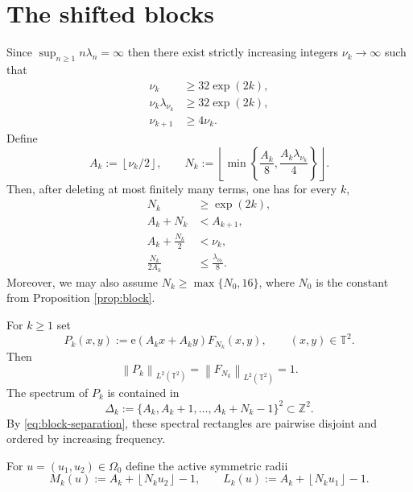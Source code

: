 \documentclass[11pt]{amsart}
\numberwithin{equation}{section}
\begin{document}
\section{The shifted blocks}

Since $\sup_{n\geq 1}n\lambda _{n}=\infty $ then there exist strictly
increasing integers $\nu _{k}\rightarrow \infty $ such that 
\begin{align}
\nu _{k}& \geq 32\exp (2k),  \label{eq:nu-large} \\
\nu _{k}\lambda _{\nu _{k}}& \geq 32\exp (2k),  \label{eq:nulambda-large} \\
\nu _{k+1}& \geq 4\nu _{k}.  \label{eq:nu-separated}
\end{align}%
Define 
\begin{equation}
A_{k}:=\left\lfloor \nu _{k}/2\right\rfloor ,\qquad N_{k}:=\left\lfloor \min
\left\{ \frac{A_{k}}{8},\frac{A_{k}\lambda _{\nu _{k}}}{4}\right\}
\right\rfloor .  \label{eq:AkNk}
\end{equation}%
Then, after deleting at most finitely many terms, one has for every $k$, 
\begin{align}
N_{k}& \geq \exp (2k),  \label{eq:N-large} \\
A_{k}+N_{k}& <A_{k+1},  \label{eq:block-separation} \\
A_{k}+\frac{N_{k}}{2}& <\nu _{k},  \label{eq:below-nu} \\
\frac{N_{k}}{2A_{k}}& \leq \frac{\lambda _{\nu _{k}}}{8}.
\label{eq:lambda-small}
\end{align}%
Moreover, we may also assume $N_{k}\geq \max \{N_{0},16\}$, where $N_{0}$ is
the constant from Proposition \ref{prop:block}.

For $k\ge1$ set 
\begin{equation}  \label{eq:Pk}
P_k(x,y):=\mathrm{e}\!\left(A_kx+A_ky\right)F_{N_k}(x,y), \qquad (x,y)\in%
\mathbb{T}^2.
\end{equation}
Then 
\begin{equation*}
\left\|P_k\right\|_{L^2(\mathbb{T}^2)}=\left\|F_{N_k}\right\|_{L^2(\mathbb{T}%
^2)}=1.
\end{equation*}
The spectrum of $P_k$ is contained in 
\begin{equation}  \label{eq:Deltak}
\Delta_k:=\{A_k,A_k+1,\dots,A_k+N_k-1\}^2\subset\mathbb{Z}^2.
\end{equation}
By \eqref{eq:block-separation}, these spectral rectangles are pairwise
disjoint and ordered by increasing frequency.

For $u=(u_{1},u_{2})\in \Omega _{0}$ define the active symmetric radii 
\begin{equation}
M_{k}(u):=A_{k}+\left\lfloor N_{k}u_{2}\right\rfloor -1,\qquad
L_{k}(u):=A_{k}+\left\lfloor N_{k}u_{1}\right\rfloor -1.
\label{eq:active-indices}
\end{equation}
\end{document}
